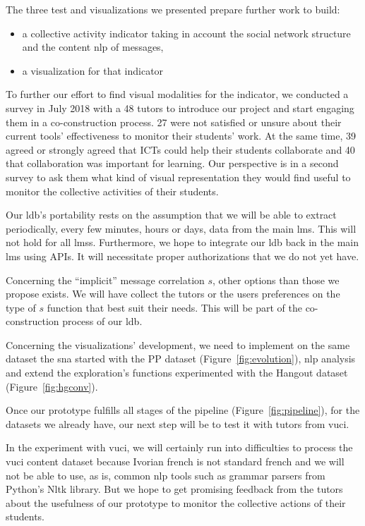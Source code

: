 \documentclass[a4paper,twoside]{article}
\begin{document}
The three test and visualizations we presented prepare further work to build:
\begin{itemize}
\item a collective activity indicator taking in account the social network structure and the content \gls{nlp} of messages,
\item a visualization for that indicator
\end{itemize}

To further our effort to find visual modalities for the indicator, we conducted a survey in July 2018 with a 48 tutors to introduce our project and start engaging them in a co-construction process.   27 were not satisfied or unsure about their current tools' effectiveness to monitor their students' work.   At the same time, 39 agreed or strongly agreed that ICTs could help their students collaborate and 40 that collaboration was important for learning.  Our perspective is in a second survey to ask them what kind of visual representation they would find useful to monitor the collective activities of their students.

Our \gls{ldb}'s portability rests on the assumption that we will be able to extract periodically, every few minutes, hours or days, data from the main \gls{lms}.  This will not hold for all \glspl{lms}.  Furthermore, we hope to integrate our \gls{ldb} back in the main \gls{lms} using APIs.  It will necessitate proper authorizations that we do not yet have.

Concerning the ``implicit'' message correlation $s$, other options than those we propose exists.  We will have collect the tutors or the users preferences on the type of $s$ function that best suit their needs.  This will be part of the co-construction process of our \gls{ldb}.

Concerning the visualizations' development, we need to implement on the same dataset the \gls{sna} started with the PP dataset (Figure~\ref{fig:evolution}), \gls{nlp} analysis and extend the exploration's functions experimented with the Hangout dataset (Figure~\ref{fig:hgconv}).

Once our prototype fulfills all stages of the pipeline (Figure~\ref{fig:pipeline}), for the datasets we already have, our next step will be to test it with tutors from \gls{vuci}.  

In the experiment with \gls{vuci}, we will certainly run into difficulties to process the \gls{vuci} content dataset because Ivorian french is not standard french and we will not be able to use, as is, common \gls{nlp} tools such as grammar parsers from Python's Nltk library.  But we hope to get promising feedback from the tutors about the usefulness of our prototype to monitor the collective actions of their students.
\end{document}
